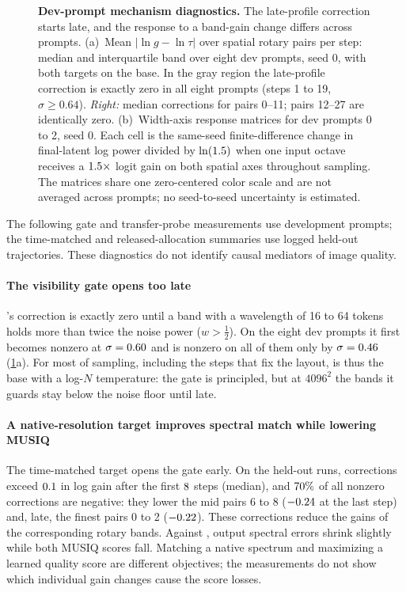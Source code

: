 \begin{figure}[!htbp]
\centering
{}
\caption{\textbf{Dev-prompt mechanism diagnostics.} The late-profile correction starts late, and the response to a band-gain change differs across prompts. (a)~Mean $|\ln g-\ln\tau|$ over spatial rotary pairs per step: median and interquartile band over eight dev prompts, seed 0, with both targets on the \ntk{} base. In the gray region the late-profile correction is exactly zero in all eight prompts (steps 1 to 19, $\sigma\geq 0.64$). \emph{Right:} median corrections for pairs 0--11; pairs 12--27 are identically zero. (b)~Width-axis response matrices for dev prompts 0 to 2, seed 0. Each cell is the same-seed finite-difference change in final-latent log power divided by $\ln(1.5)$ when one input octave receives a $1.5\times$ logit gain on both spatial axes throughout sampling. The matrices share one zero-centered color scale and are not averaged across prompts; no seed-to-seed uncertainty is estimated.}
\label{fig:mechanism}
\end{figure}

The following gate and transfer-probe measurements use development prompts; the time-matched and released-allocation summaries use logged held-out trajectories. These diagnostics do not identify causal mediators of image quality.

\paragraph{The visibility gate opens too late}
\constancy's correction is exactly zero until a band with a wavelength of 16 to 64 tokens holds more than twice the noise power ($w>\tfrac12$). On the eight dev prompts it first becomes nonzero at $\sigma=0.60$ and is nonzero on all of them only by $\sigma=0.46$ (\cref{fig:mechanism}a). For most of sampling, including the steps that fix the layout, \constancy{} is thus the \ntk{} base with a log-$N$ temperature: the gate is principled, but at $4096^2$ the bands it guards stay below the noise floor until late.

\paragraph{A native-resolution target improves spectral match while lowering MUSIQ}
The time-matched target opens the gate early. On the held-out \constancytm{} runs, corrections exceed $0.1$ in log gain after the first $8$ steps (median), and $70\%$ of all nonzero corrections are negative: they lower the mid pairs 6 to 8 ($-0.24$ at the last step) and, late, the finest pairs 0 to 2 ($-0.22$). These corrections reduce the gains of the corresponding rotary bands. Against \tempsb, output spectral errors shrink slightly while both MUSIQ scores fall. Matching a native spectrum and maximizing a learned quality score are different objectives; the measurements do not show which individual gain changes cause the score losses.

